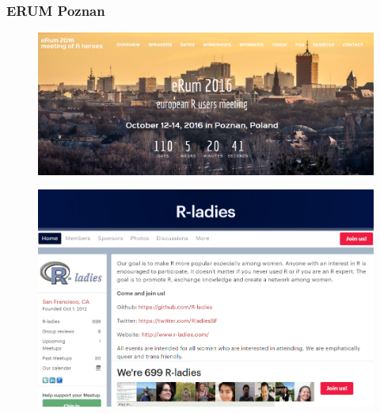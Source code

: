 \documentclass{beamer}
\begin{document}
\begin{frame}
	\frametitle{ERUM Poznan}
	

\begin{figure}
\centering
\includegraphics[width=1.1\linewidth]{erum}

\end{figure}

\end{frame}
\begin{frame}
	\begin{figure}
\centering
\includegraphics[width=1.1\linewidth]{rladies}

\end{figure}

\end{frame}
\end{document}
